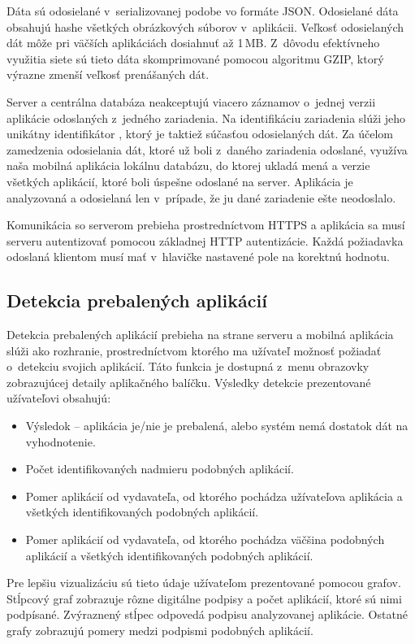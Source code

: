 Dáta sú odosielané v~serializovanej podobe vo formáte JSON. Odosielané dáta obsahujú hashe všetkých obrázkových súborov v~aplikácii. Veľkosť odosielaných dát môže pri väčších aplikáciách dosiahnuť až 1\,MB. Z~dôvodu efektívneho využitia siete sú tieto dáta skomprimované pomocou algoritmu GZIP, ktorý výrazne zmenší veľkosť prenášaných dát.

Server a centrálna databáza neakceptujú viacero záznamov o~jednej verzii aplikácie odoslaných z~jedného zariadenia. Na identifikáciu zariadenia slúži jeho unikátny identifikátor , ktorý je taktiež súčasťou odosielaných dát. Za účelom zamedzenia odosielania dát, ktoré už boli z~daného zariadenia odoslané, využíva naša mobilná aplikácia lokálnu databázu, do ktorej ukladá mená a verzie všetkých aplikácií, ktoré boli úspešne odoslané na server. Aplikácia je analyzovaná a odosielaná len v~prípade, že ju dané zariadenie ešte neodoslalo.

Komunikácia so serverom prebieha prostredníctvom HTTPS a aplikácia sa musí serveru autentizovať pomocou základnej HTTP autentizácie. Každá požiadavka odoslaná klientom musí mať v~hlavičke nastavené pole  na korektnú hodnotu.

\subsection{Detekcia prebalených aplikácií}
Detekcia prebalených aplikácií prebieha na strane serveru a mobilná aplikácia slúži ako rozhranie, prostredníctvom ktorého ma užívateľ možnosť požiadať o~detekciu svojich aplikácií. Táto funkcia je dostupná z~menu obrazovky zobrazujúcej detaily aplikačného balíčku. Výsledky detekcie prezentované užívateľovi obsahujú:
\begin{itemize}
	\item Výsledok -- aplikácia je/nie je prebalená, alebo systém nemá dostatok dát na vyhodnotenie.
	\item Počet identifikovaných nadmieru podobných aplikácií.
	\item Pomer aplikácií od vydavateľa, od ktorého pochádza užívateľova aplikácia a všetkých identifikovaných podobných aplikácií.
	\item Pomer aplikácií od vydavateľa, od ktorého pochádza väčšina podobných aplikácií a všetkých identifikovaných podobných aplikácií.
\end{itemize}

Pre lepšiu vizualizáciu sú tieto údaje užívateľom prezentované pomocou grafov. Stĺpcový graf zobrazuje rôzne digitálne podpisy a počet aplikácií, ktoré sú nimi podpísané. Zvýraznený stĺpec odpovedá podpisu analyzovanej aplikácie. Ostatné grafy zobrazujú pomery medzi podpismi podobných aplikácií.

